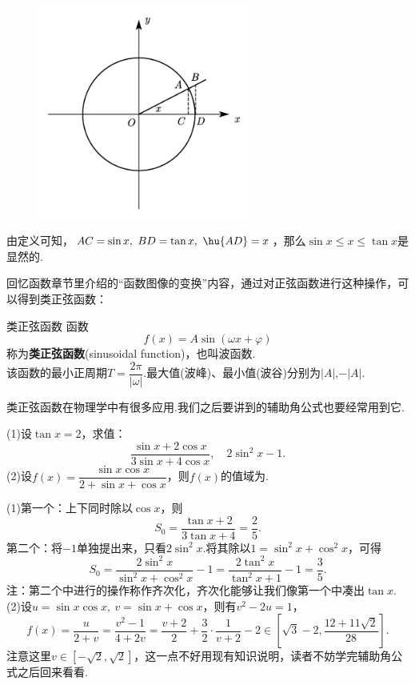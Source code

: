 \documentclass[lang=cn, zihao=5]{elegantbook}
\newcommand{\tk}{\uline{\hspace{4em}}}
\begin{document}
\begin{figure}[H]
	\centering
	\includegraphics[width=7cm]{attachment/20230622 copy.pdf}
\end{figure}

由定义可知，$AC=\sin x,~BD = \tan x,~\hu{AD}=x$，那么$\sin x \leq x \leq \tan x$是显然的.

回忆函数章节里介绍的“函数图像的变换”内容，通过对正弦函数进行这种操作，可以得到类正弦函数：

\begin{definition}{类正弦函数}
    函数$$f(x)=A \sin (\omega x + \varphi)$$
    称为\textbf{类正弦函数}(sinusoidal function)，也叫波函数.\\
    该函数的最小正周期$T=\dfrac{2\pi}{|\omega|}$.最大值(波峰)、最小值(波谷)分别为$|A|$,$-|A|$.
\end{definition}

类正弦函数在物理学中有很多应用.我们之后要讲到的辅助角公式也要经常用到它.

\begin{example}
	(1)设$\tan x=2$，求值：$$\frac{\sin x + 2\cos x}{3\sin x + 4\cos x},\quad 2\sin ^2 x-1.$$
	(2)设$f(x)=\dfrac{\sin x \cos x}{2+\sin x+\cos x}$，则$f(x)$的值域为\tk .
\end{example}
\begin{solution}
	(1)第一个：上下同时除以$\cos x$，则$$S_0 = \frac{\tan x + 2}{3\tan x +4} = \frac{2}{5}.$$
	第二个：将$-1$单独提出来，只看$2\sin ^2x$.将其除以$1=\sin ^2x + \cos ^2 x$，可得$$S_0 = \frac{2\sin ^2 x}{\sin ^2x + \cos ^2 x} -1 = \frac{2\tan ^2x}{\tan ^2x +1}-1 = \frac{3}{5}.$$
	注：第二个中进行的操作称作齐次化，齐次化能够让我们像第一个中凑出$\tan x$. \\
	(2)设$u=\sin x \cos x,~v=\sin x + \cos x$，则有$v^2-2u=1$，$$f(x) = \frac{u}{2+v} = \frac{v^2-1}{4+2v} = \frac{v+2}{2} + \frac{3}{2} \cdot \frac{1}{v+2} -2 \in [\sqrt{3}-2,\frac{12+11\sqrt{2}}{28}].$$
	注意这里$v \in [-\sqrt{2},\sqrt{2}]$，这一点不好用现有知识说明，读者不妨学完辅助角公式之后回来看看.
\end{solution}
\end{document}
